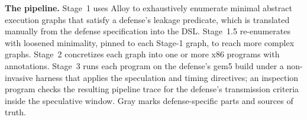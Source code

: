 \textbf{The \toolname{} pipeline.} Stage~1 uses Alloy to exhaustively enumerate minimal abstract execution graphs that satisfy a defense's leakage predicate, which is translated manually from the defense specification into the \toolname{} DSL. Stage~1.5 re-enumerates with loosened minimality, pinned to each Stage-1 graph, to reach more complex graphs. Stage~2 concretizes each graph into one or more x86 programs with annotations. Stage~3 runs each program on the defense's gem5 build under a non-invasive harness that applies the speculation and timing directives; an inspection program checks the resulting pipeline trace for the defense's transmission criteria inside the speculative window. Gray marks defense-specific parts and sources of truth.
